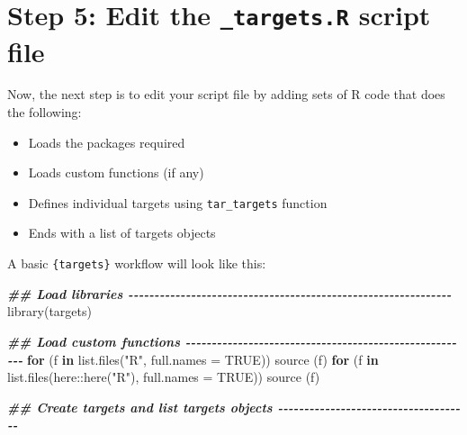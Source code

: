 \documentclass[
  12pt,
]{book}
\newenvironment{Shaded}{\begin{snugshade}}{\end{snugshade}}
\newcommand{\AttributeTok}[1]{\textcolor[rgb]{0.77,0.63,0.00}{#1}}
\newcommand{\ConstantTok}[1]{\textcolor[rgb]{0.00,0.00,0.00}{#1}}
\newcommand{\ControlFlowTok}[1]{\textcolor[rgb]{0.13,0.29,0.53}{\textbf{#1}}}
\newcommand{\DocumentationTok}[1]{\textcolor[rgb]{0.56,0.35,0.01}{\textbf{\textit{#1}}}}
\newcommand{\FunctionTok}[1]{\textcolor[rgb]{0.00,0.00,0.00}{#1}}
\newcommand{\NormalTok}[1]{#1}
\newcommand{\SpecialCharTok}[1]{\textcolor[rgb]{0.00,0.00,0.00}{#1}}
\newcommand{\StringTok}[1]{\textcolor[rgb]{0.31,0.60,0.02}{#1}}
\providecommand{\tightlist}{%
  \setlength{\itemsep}{0pt}\setlength{\parskip}{0pt}}
\begin{document}
\hypertarget{step-5-edit-the-_targets.r-script-file}{%
\section{\texorpdfstring{Step 5: Edit the \texttt{\_targets.R} script file}{Step 5: Edit the \_targets.R script file}}\label{step-5-edit-the-_targets.r-script-file}}

Now, the next step is to edit your script file by adding sets of R code that does the following:

\begin{itemize}
\tightlist
\item
  Loads the packages required
\item
  Loads custom functions (if any)
\item
  Defines individual targets using \texttt{tar\_targets} function
\item
  Ends with a list of targets objects
\end{itemize}

A basic \texttt{\{targets\}} workflow will look like this:

\begin{Shaded}
\begin{Highlighting}[]
\DocumentationTok{\#\# Load libraries {-}{-}{-}{-}{-}{-}{-}{-}{-}{-}{-}{-}{-}{-}{-}{-}{-}{-}{-}{-}{-}{-}{-}{-}{-}{-}{-}{-}{-}{-}{-}{-}{-}{-}{-}{-}{-}{-}{-}{-}{-}{-}{-}{-}{-}{-}{-}{-}{-}{-}{-}{-}{-}{-}{-}{-}{-}{-}{-}{-}{-}{-}}
\FunctionTok{library}\NormalTok{(targets)}



\DocumentationTok{\#\# Load custom functions {-}{-}{-}{-}{-}{-}{-}{-}{-}{-}{-}{-}{-}{-}{-}{-}{-}{-}{-}{-}{-}{-}{-}{-}{-}{-}{-}{-}{-}{-}{-}{-}{-}{-}{-}{-}{-}{-}{-}{-}{-}{-}{-}{-}{-}{-}{-}{-}{-}{-}{-}{-}{-}{-}{-}}
\ControlFlowTok{for}\NormalTok{ (f }\ControlFlowTok{in} \FunctionTok{list.files}\NormalTok{(}\StringTok{"R"}\NormalTok{, }\AttributeTok{full.names =} \ConstantTok{TRUE}\NormalTok{)) }\FunctionTok{source}\NormalTok{ (f)}
\ControlFlowTok{for}\NormalTok{ (f }\ControlFlowTok{in} \FunctionTok{list.files}\NormalTok{(here}\SpecialCharTok{::}\FunctionTok{here}\NormalTok{(}\StringTok{"R"}\NormalTok{), }\AttributeTok{full.names =} \ConstantTok{TRUE}\NormalTok{)) }\FunctionTok{source}\NormalTok{ (f)}


\DocumentationTok{\#\# Create targets and list targets objects {-}{-}{-}{-}{-}{-}{-}{-}{-}{-}{-}{-}{-}{-}{-}{-}{-}{-}{-}{-}{-}{-}{-}{-}{-}{-}{-}{-}{-}{-}{-}{-}{-}{-}{-}{-}{-}}


\end{Highlighting}
\end{Shaded}


  
\end{document}
